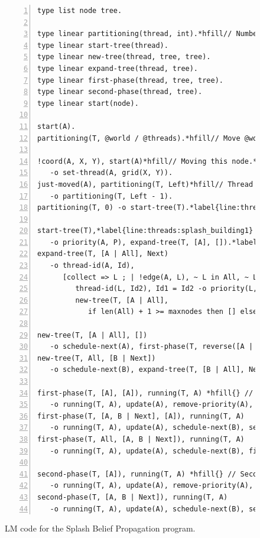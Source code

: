 \begin{figure}[!htb]
\begin{Verbatim}[numbers=left,commandchars=*\{\},fontsize=\codesize]
type list node tree.

type linear partitioning(thread, int).*hfill// Number of nodes to receive.
type linear start-tree(thread).
type linear new-tree(thread, tree, tree).
type linear expand-tree(thread, tree).
type linear first-phase(thread, tree, tree).
type linear second-phase(thread, tree).
type linear start(node).

start(A).
partitioning(T, @world / @threads).*hfill// Move @world/@threads nodes.

!coord(A, X, Y), start(A)*hfill// Moving this node.*label{line:threads:splash_part1}
   -o set-thread(A, grid(X, Y)).
just-moved(A), partitioning(T, Left)*hfill// Thread received another node.
   -o partitioning(T, Left - 1).
partitioning(T, 0) -o start-tree(T).*label{line:threads:splash_part2}*label{line:threads:splash_first}

start-tree(T),*label{line:threads:splash_building1} priority(A, P), P > 0.0 *hfill{} // Tree building
   -o priority(A, P), expand-tree(T, [A], []).*label{line:threads:splash_building2}
expand-tree(T, [A | All], Next)
   -o thread-id(A, Id),
      [collect => L ; | !edge(A, L), ~ L in All, ~ L in Next,*label{line:threads:splash_agg1} priority(L, P), P > 0.0,
         thread-id(L, Id2), Id1 = Id2 -o priority(L, P), thread-id(L, Id2) ->
         new-tree(T, [A | All],
            if len(All) + 1 >= maxnodes then [] else Next ++ L end)].*label{line:threads:splash_agg2}*label{line:threads:splash_next}

new-tree(T, [A | All], [])
   -o schedule-next(A), first-phase(T, reverse([A | All]), [A | All]).*label{line:threads:splash_first_phase}
new-tree(T, All, [B | Next])
   -o schedule-next(B), expand-tree(T, [B | All], Next).

first-phase(T, [A], [A]), running(T, A) *hfill{} // First phase
   -o running(T, A), update(A), remove-priority(A), start-tree(T).
first-phase(T, [A, B | Next], [A]), running(T, A)
   -o running(T, A), update(A), schedule-next(B), second-phase(T, [B | Next]).*label{line:threads:splash_first_update1}
first-phase(T, All, [A, B | Next]), running(T, A)
   -o running(T, A), update(A), schedule-next(B), first-phase(T, All, [B | Next]).*label{line:threads:splash_first_update2}

second-phase(T, [A]), running(T, A) *hfill{} // Second phase
   -o running(T, A), update(A), remove-priority(A), start-tree(T).*label{line:threads:splash_second_update1}
second-phase(T, [A, B | Next]), running(T, A)
   -o running(T, A), update(A), schedule-next(B), second-phase(T, [B | Next]).*label{line:threads:splash_second_update2}
\end{Verbatim}

   \caption{LM code for the Splash Belief Propagation program.}
  \label{code:threads:sbp}
\end{figure}


